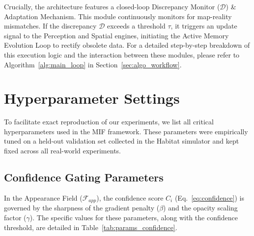 \documentclass[conference]{IEEEtran}
\begin{document}
Crucially, the architecture features a closed-loop Discrepancy Monitor ($\mathcal{D}$) \& Adaptation Mechanism. This module continuously monitors for map-reality mismatches. If the discrepancy $\mathcal{D}$ exceeds a threshold $\tau$, it triggers an update signal to the Perception and Spatial engines, initiating the Active Memory Evolution Loop to rectify obsolete data. For a detailed step-by-step breakdown of this execution logic and the interaction between these modules, please refer to Algorithm~\ref{alg:main_loop} in Section~\ref{sec:algo_workflow}.


\section{Hyperparameter Settings}
\label{sec:hyperparameters}

To facilitate exact reproduction of our experiments, we list all critical hyperparameters used in the MIF framework. These parameters were empirically tuned on a held-out validation set collected in the Habitat simulator and kept fixed across all real-world experiments.

\subsection{Confidence Gating Parameters}
In the Appearance Field ($\mathcal{F}_{app}$), the confidence score $C_i$ (Eq.~\ref{eq:confidence}) is governed by the sharpness of the gradient penalty ($\beta$) and the opacity scaling factor ($\gamma$). The specific values for these parameters, along with the confidence threshold, are detailed in Table~\ref{tab:params_confidence}.

\begin{table}[h]
\centering
\caption{\textbf{Parameters for Jitter-Aware Confidence Gating.}}
\label{tab:params_confidence}
\end{table}
\end{document}
